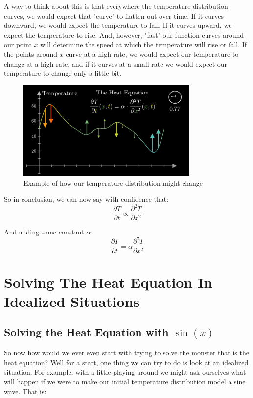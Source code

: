 \documentclass{report}
\begin{document}
A way to think about this is that everywhere the temperature distribution curves, we would expect that 
"curve" to flatten out over time. If it curves downward, we would expect the temperature to fall. If it curves upward, we expect the temperature to rise. And, however, "fast" our function curves around our point $x$
will determine the speed at which the temperature will rise or fall. If the points around $x$ curve at a high rate, we would expect our  temperature to change at a high rate, and if it curves at a small rate we would expect our temperature to change only a little bit.

\begin{figure}[h]
    \centering
    \includegraphics[width=0.8\textwidth]{images/intutition_behind_heat_equation.png}
    \caption{Example of how our temperature distribution might change}
\end{figure}

So in conclusion, we can now say with confidence that: 
\[ \frac{\partial T}{\partial t} \propto \frac{\partial^2 T}{\partial x^2} \]

And adding some constant $\alpha$:
\[ \frac{\partial T}{\partial t} = \alpha \frac{\partial^2 T}{\partial x^2} \]

\chapter{Solving The Heat Equation In Idealized Situations}

\section{Solving the Heat Equation with $\sin(x)$}

So now how would we ever even start with trying to solve the monster that is the heat equation?
Well for a start, one thing we can try to do is look at an idealized situation. For example,
with a little playing around we might ask ourselves what will happen if we were to make
our initial temperature distribution model a sine wave. That is:
\end{document}
